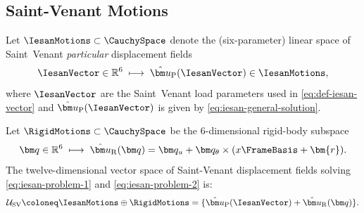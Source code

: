 

\subsection{Saint-Venant Motions}

\begin{definition}
\label{def:sv-family}
Let $\IesanMotions\subset \CauchySpace$ denote the (six-parameter) linear space of
Saint~Venant \emph{particular} displacement fields
\[
  \IesanVector\in\mathbb R^6 \;\longmapsto\; \hat{\bm u}_{\rm P}(\IesanVector)\in\IesanMotions,
\]
where $\IesanVector$ are the
Saint~Venant load parameters used in \eqref{eq:def-iesan-vector}
and $\hat{\bm u}_{\rm P}(\IesanVector)$ is given by \eqref{eq:iesan-general-solution}.

Let $\RigidMotions\subset\CauchySpace$ be the $6$-dimensional rigid-body subspace
\[
  \bm q\in\mathbb R^6 \;\longmapsto\; \hat{\bm u}_{\rm R}(\bm q)
  =\bm q_u + \bm q_\theta\times(x\FrameBasis+\bm{r}).
\]
The twelve-dimensional vector space of 
Saint-Venant displacement fields solving \eqref{eq:iesan-problem-1} and \eqref{eq:iesan-problem-2} is:
\[
  \mathcal U_{\rm SV}\coloneq \IesanMotions\oplus \RigidMotions
  =\{\hat{\bm u}_{\rm P}(\IesanVector)+\hat{\bm u}_{\rm R}(\bm q)\}.
\]
\end{definition}


